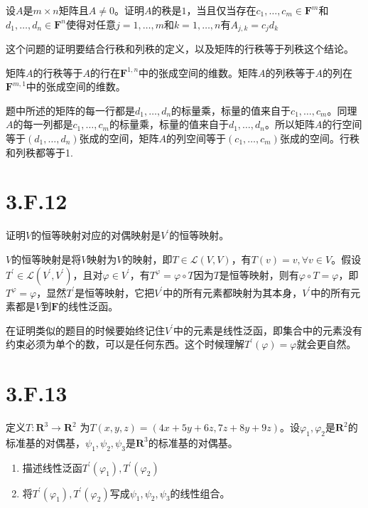 \documentclass[10pt,a4paper,UTF8]{article}
\begin{document}
\begin{problem}
设\(A\)是\(m\times n\)矩阵且\(A\neq 0\)。证明\(A\)的秩是\(1\)，当且仅当存在\(c_{1},\ldots ,c_{m}\in \mathbf{F}^{m}\)和\(d_{1},\ldots ,d_{n}\in \mathbf{F}^{n}\)使得对任意\(j=1,\ldots ,m\)和\(k=1,\ldots ,n\)有\(A_{j,k} = c_{j}d_{k}\)
\end{problem}

\begin{answer}
这个问题的证明要结合行秩和列秩的定义，以及矩阵的行秩等于列秩这个结论。

矩阵\(A\)的行秩等于\(A\)的行在\(\mathbf{F}^{1,n}\)中的张成空间的维数。矩阵\(A\)的列秩等于\(A\)的列在\(\mathbf{F}^{m,1}\)中的张成空间的维数。

题中所述的矩阵的每一行都是\(d_{1},\ldots ,d_{n}\)的标量乘，标量的值来自于\(c_{1},\ldots ,c_{m}\)。同理\(A\)的每一列都是\(c_{1},\ldots ,c_{m}\)的标量乘，标量的值来自于\(d_{1},\ldots ,d_{n}\)。所以矩阵\(A\)的行空间等于\((d_{1},\ldots ,d_{n})\)张成的空间，矩阵\(A\)的列空间等于\((c_{1},\ldots ,c_{m})\)张成的空间。行秩和列秩都等于1.
\end{answer}
\section{3.F.12}
\label{sec:org72b547e}


\begin{problem}
证明\(V\)的恒等映射对应的对偶映射是\(V^{'}\)的恒等映射。
\end{problem}

\begin{answer}
\(V\)的恒等映射是将\(V\)映射为\(V\)的映射，即\(T\in \mathcal{L}(V,V)\)，有\(T(v) = v,\forall v\in V\)。假设\(T^{'}\in  \mathcal{L}(V^{'},V^{'})\)，且对\(\varphi\in V^{'}\)，有\(T^{\varphi} = \varphi\circ T\)因为\(T\)是恒等映射，则有\(\varphi\circ T = \varphi\)，即\(T^{\varphi} = \varphi\)，显然\(T^{'}\)是恒等映射，它把\(V^{'}\)中的所有元素都映射为其本身，\(V^{'}\)中的所有元素都是\(V\)到\(\mathbf{F}\)的线性泛函。

在证明类似的题目的时候要始终记住\(V^{'}\)中的元素是线性泛函，即集合中的元素没有约束必须为单个的数，可以是任何东西。这个时候理解\(T^{'}(\varphi) = \varphi\)就会更自然。
\end{answer}
\section{3.F.13}
\label{sec:orga756810}


\begin{problem}
定义\(T: \mathbf{R}^{3}\rightarrow \mathbf{R}^{2}\) 为\(T(x,y,z) = (4x+5y+6z,7z+8y+9z)\)。设\(\varphi_{1},\varphi_{2}\)是\(\mathbf{R}^{2}\)的标准基的对偶基，\(\psi_{1},\psi_{2},\psi_{3}\)是\(\mathbf{R}^{3}\)的标准基的对偶基。

\begin{enumerate}
\item 描述线性泛函\(T^{'}(\varphi_{1}),T^{'}(\varphi_{2})\)
\item 将\(T^{'}(\varphi_{1}),T^{'}(\varphi_{2})\)写成\(\psi_{1},\psi_{2},\psi_{3}\)的线性组合。
\end{enumerate}
\end{problem}
\end{document}
